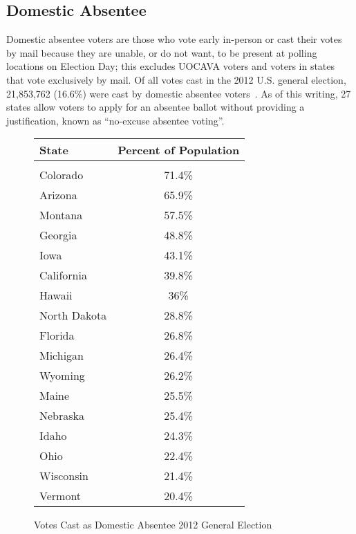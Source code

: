 \subsection{Domestic Absentee}
Domestic absentee voters are those who vote early in-person or cast
their votes by mail because they are unable, or do not want, to be
present at polling locations on Election Day; this excludes UOCAVA
voters and voters in states that vote exclusively by mail. Of all
votes cast in the 2012 U.S. general election, 21,853,762 (16.6\%) were
cast by domestic absentee voters~\cite{eac2012survey}. As of this
writing, 27 states allow voters to apply for an absentee ballot
without providing a justification, known as ``no-excuse absentee
voting''.


\begin{figure}
\begin{center}
\begin{tabular}{l c}
{\bf State} & {\bf Percent of Population}\\\hline\\
Colorado & 71.4\%\\
Arizona & 65.9\%\\
Montana & 57.5\%\\
Georgia & 48.8\%\\
Iowa & 43.1\%\\
California & 39.8\%\\
Hawaii & 36\%\\
North Dakota & 28.8\%\\
Florida & 26.8\%\\
Michigan & 26.4\%\\
Wyoming & 26.2\%\\
Maine & 25.5\%\\
Nebraska & 25.4\%\\
Idaho & 24.3\%\\
Ohio & 22.4\%\\
Wisconsin & 21.4\%\\
Vermont & 20.4\%\\
\end{tabular}
\end{center}
\caption{Votes Cast as Domestic Absentee 2012 General Election}
\label{fig:domestic_populations}
\end{figure}


